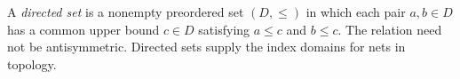 
A \emph{directed set} is a nonempty preordered set $(D,\le)$ in which each pair $a,b\in D$ has a common upper bound $c\in D$ satisfying $a\le c$ and $b\le c$. The relation need not be antisymmetric. Directed sets supply the index domains for nets in topology.
